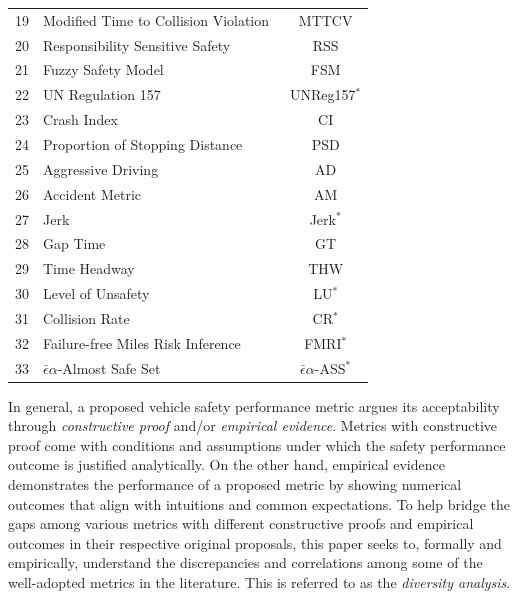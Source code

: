 \documentclass[journal]{IEEEtran}
\begin{document}
\begin{table}[!b]
{\begin{tabular}{l|l|c}
    19 & Modified Time to Collision Violation~\cite{Ozbay2008Derivation} & MTTCV   \\ 
    20 & Responsibility Sensitive Safety~\cite{shalev2017formal} & RSS  \\ 
    21 & Fuzzy Safety Model~\cite{mattas2020fuzzy} &  FSM  \\
    22 & UN Regulation 157~\cite{united2020proposal}  & UNReg157$^*$ \\
    23 & Crash Index~\cite{Ozbay2008Derivation} & CI   \\
    24 & Proportion of Stopping Distance~\cite{astarita2019traffic} & PSD   \\ 
    25 & Aggressive Driving~\cite{wishart2020driving} & AD  \\
    26 & Accident Metric~\cite{otte2003scientific} & AM   \\ 
    27 & Jerk~\cite{bellem2018comfort} & Jerk$^*$ \\
    28 & Gap Time~\cite{vogel2002characterizes} & GT \\
    29 & Time Headway~\cite{Jansson2005CollisionAT} & THW   \\
    30 & Level of Unsafety~\cite{barcelo2003safety} & LU$^*$   \\ 
    31 & Collision Rate & CR$^*$ \\
    32 & Failure-free Miles Risk Inference~\cite{kalra2016driving} & FMRI$^*$ \\
    33 & $\bar{\epsilon}\alpha$-Almost Safe Set~\cite{weng2023finite} &$\bar{\epsilon}\alpha$-ASS$^*$ \\ \hline
    \end{tabular}%
    }
\end{table}

In general, a proposed vehicle safety performance metric argues its acceptability through \emph{constructive proof} and/or \emph{empirical evidence}. Metrics with constructive proof come with conditions and assumptions under which the safety performance outcome is justified analytically. On the other hand, empirical evidence demonstrates the performance of a proposed metric by showing numerical outcomes that align with intuitions and common expectations. To help bridge the gaps among various metrics with different constructive proofs and empirical outcomes in their respective original proposals, this paper seeks to, formally and empirically, understand the discrepancies and correlations among some of the well-adopted metrics in the literature. This is referred to as the \emph{diversity analysis}.
\end{document}
